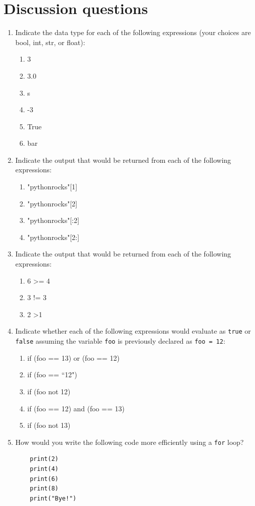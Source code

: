 \documentclass{book}
\begin{document}
\section{Discussion questions}
\begin{enumerate}
	\item Indicate the data type for each of the following expressions (your choices are bool, int, str, or float):
	\begin{enumerate}
		\item 3
		\item 3.0
		\item s
		\item -3
		\item True
		\item bar
	\end{enumerate}
	\item Indicate the output that would be returned from each of the following expressions:
	\begin{enumerate}
		\item "pythonrocks"[1]
		\item "pythonrocks"[2]
		\item "pythonrocks"[:2]
		\item "pythonrocks"[2:]
	\end{enumerate}
	\item Indicate the output that would be returned from each of the following expressions:
	\begin{enumerate}
		\item 6 \textgreater = 4
		\item 3 != 3
		\item 2 \textgreater 1
	\end{enumerate}
	\item Indicate whether each of the following expressions would evaluate as \texttt{true} or \texttt{false} assuming the variable \texttt{foo} is previously declared as \texttt{foo = 12}:
	\begin{enumerate}
		\item if (foo == 13) or (foo == 12)
		\item if (foo == ``12")
		\item if (foo not 12)
		\item if (foo == 12) and (foo == 13)
		\item if (foo not 13)
	\end{enumerate}
	\item How would you write the following code more efficiently using a \texttt{for} loop?
	\begin{lstlisting}
	print(2)
	print(4)
	print(6)
	print(8)
	print("Bye!")
	\end{lstlisting}
		
\end{enumerate}
\end{document}
